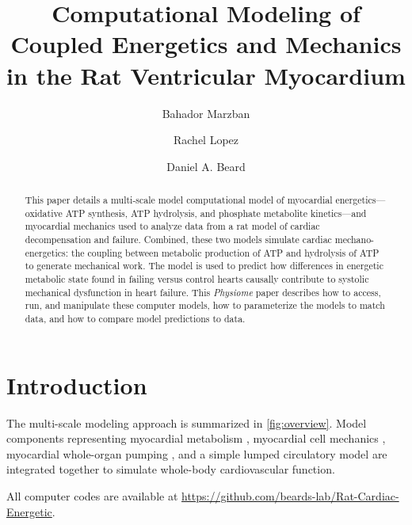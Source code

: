 \documentclass[fleqn,10pt]{physiome}
\title{Computational Modeling of Coupled Energetics and Mechanics in the Rat Ventricular Myocardium}
\author[1]{Bahador Marzban}
\author[1]{Rachel Lopez}
\author[1][beardda@umich.edu]{Daniel A. Beard}
\affil[1]{Molecular and Integrative Physiology, University of Michigan, Ann Arbor, Michigan, USA}
\begin{document}
\maketitle

\begin{abstract}
This paper details a multi-scale model computational model of myocardial energetics---oxidative ATP synthesis, ATP hydrolysis, and phosphate metabolite kinetics---and myocardial mechanics used to analyze data from a rat model of cardiac decompensation and failure. Combined, these two models simulate cardiac mechano-energetics: the coupling between metabolic production of ATP and hydrolysis of ATP to generate mechanical work. The model is used to predict how differences in energetic metabolic state  found in failing versus control hearts causally contribute to systolic mechanical dysfunction in heart failure. This {\em Physiome} paper describes how to access, run, and manipulate these computer models, how to parameterize the models to match data, and how to compare model predictions to data.
\end{abstract}



\section{Introduction}

The multi-scale modeling approach is summarized in \autoref{fig:overview}. Model components representing myocardial metabolism \citep{Bazil2016}, myocardial cell mechanics \citep{Tewari2016a,Tewari2016b}, myocardial whole-organ pumping \citep{Lumens2009}, and a simple lumped circulatory model are integrated together to simulate whole-body cardiovascular function. 

All computer codes are available at \url{https://github.com/beards-lab/Rat-Cardiac-Energetic}. 
 
\end{document}
